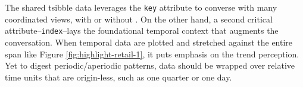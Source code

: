 The shared tsibble data leverages the \texttt{key} attribute to converse
with many coordinated views, with or without . On the
other hand, a second critical attribute--\texttt{index}--lays the
foundational temporal context that augments the conversation. When
temporal data are plotted and stretched against the entire span like
Figure \ref{fig:highlight-retail-1}, it puts emphasis on the trend
perception. Yet to digest periodic/aperiodic patterns, data should be
wrapped over relative time units that are origin-less, such as one
quarter or one day.

\begin{Schunk}
\begin{figure}

{\centering {}\newline{}\newline{}

}
\end{figure}
\end{Schunk}
